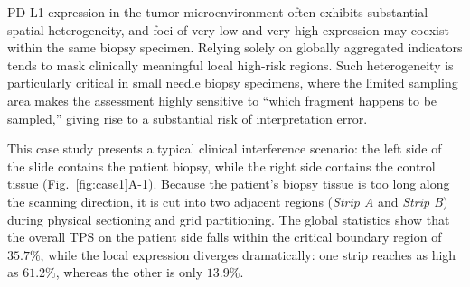 \documentclass[journal]{vgtc}                     %
\begin{document}
PD-L1 expression in the tumor microenvironment often exhibits substantial spatial heterogeneity, and foci of very low and very high expression may coexist within the same biopsy specimen. Relying solely on globally aggregated indicators tends to mask clinically meaningful local high-risk regions. Such heterogeneity is particularly critical in small needle biopsy specimens, where the limited sampling area makes the assessment highly sensitive to ``which fragment happens to be sampled,'' giving rise to a substantial risk of interpretation error.

This case study presents a typical clinical interference scenario: the left side of the slide contains the patient biopsy, while the right side contains the control tissue (Fig.~\ref{fig:case1}A-1). Because the patient's biopsy tissue is too long along the scanning direction, it is cut into two adjacent regions (\textit{Strip A} and \textit{Strip B}) during physical sectioning and grid partitioning. The global statistics show that the overall TPS on the patient side falls within the critical boundary region of $35.7\%$, while the local expression diverges dramatically: one strip reaches as high as $61.2\%$, whereas the other is only $13.9\%$.
\end{document}
